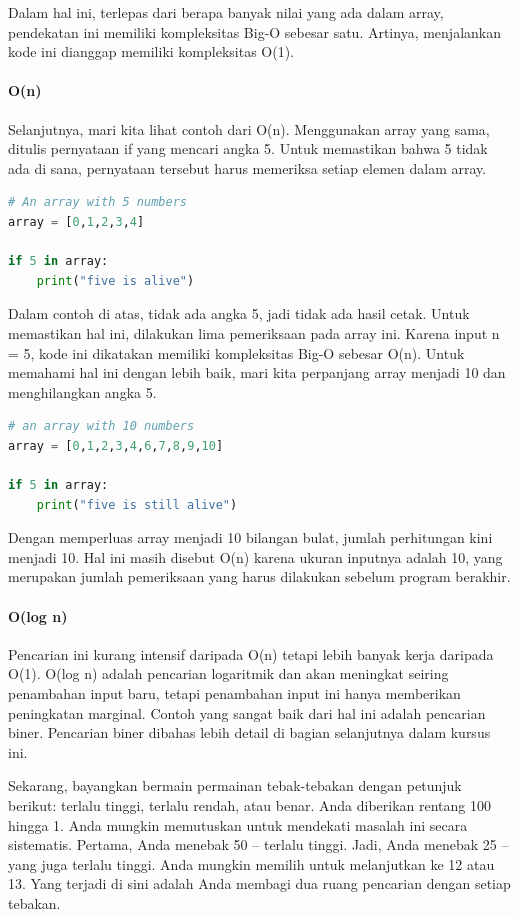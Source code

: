 \documentclass{article}
\begin{document}
Dalam hal ini, terlepas dari berapa banyak nilai yang ada dalam array, pendekatan ini memiliki kompleksitas Big-O sebesar satu. Artinya, menjalankan kode ini dianggap memiliki kompleksitas O(1).

\paragraph{O(n)}

Selanjutnya, mari kita lihat contoh dari O(n). Menggunakan array yang sama, ditulis pernyataan if yang mencari angka 5. Untuk memastikan bahwa 5 tidak ada di sana, pernyataan tersebut harus memeriksa setiap elemen dalam array.
\begin{lstlisting}[language=Python, caption={}, captionpos=b]
# An array with 5 numbers 
array = [0,1,2,3,4] 

if 5 in array:
    print("five is alive")
\end{lstlisting}

Dalam contoh di atas, tidak ada angka 5, jadi tidak ada hasil cetak. Untuk memastikan hal ini, dilakukan lima pemeriksaan pada array ini. Karena input n = 5, kode ini dikatakan memiliki kompleksitas Big-O sebesar O(n). Untuk memahami hal ini dengan lebih baik, mari kita perpanjang array menjadi 10 dan menghilangkan angka 5.
\begin{lstlisting}[language=Python, caption={}, captionpos=b]
# an array with 10 numbers 
array = [0,1,2,3,4,6,7,8,9,10]

if 5 in array:
    print("five is still alive")
\end{lstlisting}

Dengan memperluas array menjadi 10 bilangan bulat, jumlah perhitungan kini menjadi 10. Hal ini masih disebut O(n) karena ukuran inputnya adalah 10, yang merupakan jumlah pemeriksaan yang harus dilakukan sebelum program berakhir.

\paragraph{O(log n)}

Pencarian ini kurang intensif daripada O(n) tetapi lebih banyak kerja daripada O(1). O(log n) adalah pencarian logaritmik dan akan meningkat seiring penambahan input baru, tetapi penambahan input ini hanya memberikan peningkatan marginal. Contoh yang sangat baik dari hal ini adalah pencarian biner. Pencarian biner dibahas lebih detail di bagian selanjutnya dalam kursus ini.

Sekarang, bayangkan bermain permainan tebak-tebakan dengan petunjuk berikut: terlalu tinggi, terlalu rendah, atau benar. Anda diberikan rentang 100 hingga 1. Anda mungkin memutuskan untuk mendekati masalah ini secara sistematis. Pertama, Anda menebak 50 – terlalu tinggi. Jadi, Anda menebak 25 – yang juga terlalu tinggi. Anda mungkin memilih untuk melanjutkan ke 12 atau 13. Yang terjadi di sini adalah Anda membagi dua ruang pencarian dengan setiap tebakan.
\end{document}
